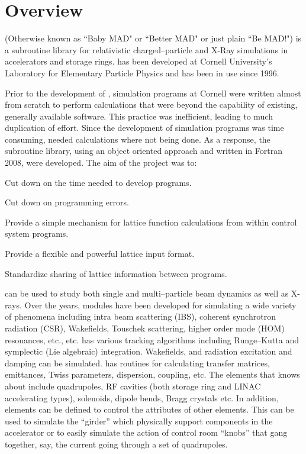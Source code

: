 \section*{Overview}

\bmad (Otherwise known as ``Baby MAD" or ``Better MAD" or just plain ``Be MAD!") is a subroutine
library for relativistic charged--particle and X-Ray simulations in accelerators and storage
rings. \bmad has been developed at Cornell University's Laboratory for Elementary Particle Physics
and has been in use since 1996.

Prior to the development of \bmad, simulation programs at Cornell were written almost from scratch
to perform calculations that were beyond the capability of existing, generally available
software. This practice was inefficient, leading to much duplication of effort.  Since the
development of simulation programs was time consuming, needed calculations where not being done.  As
a response, the \bmad subroutine library, using an object oriented approach and written in Fortran
2008, were developed.  The aim of the \bmad project was to:
\begin{Itemize}
\item Cut down on the time needed to develop programs.
\item Cut down on programming errors.
\item Provide a simple mechanism for lattice function calculations
from within control system programs.
\item Provide a flexible and powerful lattice input format.
\item Standardize sharing of lattice information between 
programs.
\end{Itemize}

\bmad can be used to study both single and multi--particle beam dynamics as well as X-rays.  Over
the years, \bmad modules have been developed for simulating a wide variety of phenomena including
intra beam scattering (IBS), coherent synchrotron radiation (CSR), Wakefields, Touschek scattering,
higher order mode (HOM) resonances, etc., etc.  \bmad has various tracking algorithms including
Runge--Kutta and symplectic (Lie algebraic) integration. Wakefields, and radiation excitation and
damping can be simulated. \bmad has routines for calculating transfer matrices, emittances, Twiss
parameters, dispersion, coupling, etc. The elements that \bmad knows about include quadrupoles, RF
cavities (both storage ring and LINAC accelerating types), solenoids, dipole bends, Bragg crystals
etc.  In addition, elements can be defined to control the attributes of other elements. This can be
used to simulate the ``girder'' which physically support components in the accelerator or to easily
simulate the action of control room ``knobs'' that gang together, say, the current going through a
set of quadrupoles.

